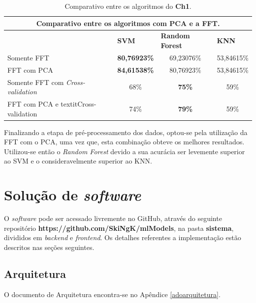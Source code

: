 \begin{table}[]
\centering
\begin{tabular}{@{}lccc@{}}
\toprule
\multicolumn{4}{c}{Comparativo entre os algoritmos com PCA e a FFT.}                                                                                \\ \midrule
                                 & \multicolumn{1}{l}{\textbf{SVM}} & \multicolumn{1}{l}{\textbf{Random Forest}} & \multicolumn{1}{l}{\textbf{KNN}} \\
Somente FFT                      & \textbf{80,76923\%}              & 69,23076\%                                 & 53,84615\%                       \\
FFT com PCA                      & \textbf{84,61538\%}              & 80,76923\%                                 & 53,84615\%                       \\
Somente FFT com \textit{Cross-validation} & 68\%                             & \textbf{75\%}                              & 59\%                             \\
FFT com PCA e textit{Cross-validation}   & 74\%                             & \textbf{79\%}                              & 59\%                             \\ \bottomrule
\end{tabular}
\caption{Comparativo entre os algoritmos do \textbf{Ch1}.}
\label{pcavalidator}
\end{table}


Finalizando a etapa de pré-processamento dos dados, optou-se pela utilização da FFT com o PCA, uma vez que, esta combinação obteve os melhores resultados. Utilizou-se então o \textit{Random Forest} devido a sua acurácia ser levemente superior ao SVM e o consideravelmente superior ao KNN.


\section{Solução de \textit{software}}
O \textit{software} pode ser acessado livremente no GitHub, através do seguinte repositório \textbf{https://github.com/SkiNgK/mlModels}, na pasta \textbf{sistema}, divididos em \textit{backend} e \textit{frontend}. Os detalhes referentes a implementação estão descritos nas seções seguintes.

\subsection{Arquitetura}
O documento de Arquitetura encontra-se no Apêndice \ref{adoarquitetura}.

